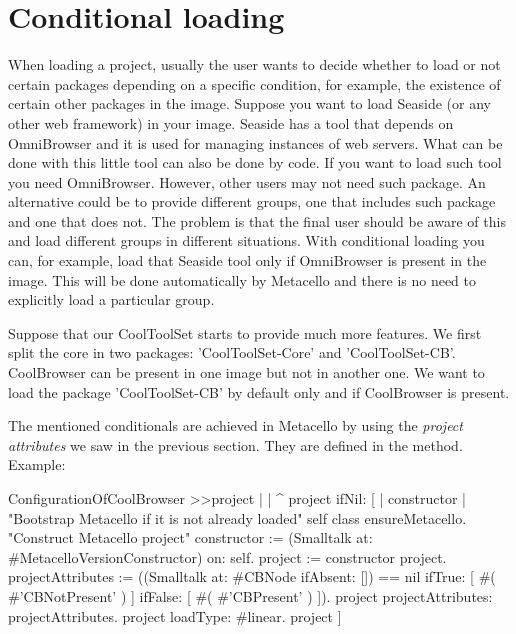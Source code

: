 \documentclass[a4paper,10pt,twoside]{book}
\begin{document}
\begin{code}{}
\begin{code}{}
\begin{code}{}
\end{code}


\section{Conditional loading}
When loading a project, usually the user wants to decide whether to load or not certain packages depending on a specific condition, for example, the existence of certain other packages in the image. Suppose you want to load Seaside (or any other web framework) in your image. Seaside has a tool that depends on OmniBrowser and it is used for managing instances of web servers. What can be done with this little tool can also be done by code. If you want to load such tool you need OmniBrowser. However, other users may not need such package. An alternative could be to provide different groups, one that includes such package and one that does not. The problem is that the final user should be aware of this and load different groups in different situations.  With conditional loading you can, for example, load that Seaside tool only if OmniBrowser is present in the image. This will be done automatically by Metacello and there is no need to explicitly load a particular group. 

Suppose that our CoolToolSet starts to provide much more features. We first split the core in two packages: 'CoolToolSet-Core' and 'CoolToolSet-CB'. CoolBrowser can be present in one image but not in another one. We want to load the package 'CoolToolSet-CB' by default only and if CoolBrowser is present. 

The mentioned conditionals are achieved in Metacello by using the \emph{project attributes} we saw in the previous section. They are defined in the  method. 
Example:


\begin{code}{}
ConfigurationOfCoolBrowser >>project
	|  | 
	^ project ifNil: [ | constructor |
		"Bootstrap Metacello if it is not already loaded"
		self class ensureMetacello.
		"Construct Metacello project"
		constructor := (Smalltalk at: #MetacelloVersionConstructor) on: self.
		project := constructor project.
		projectAttributes :=  ((Smalltalk at: #CBNode ifAbsent: []) == nil
			ifTrue: [ #( #'CBNotPresent' ) ]
			ifFalse: [ #( #'CBPresent' ) ]).
		project projectAttributes:  projectAttributes.
		project loadType: #linear.
		project ]

\end{code}


\end{code}
\end{code}
\end{document}
